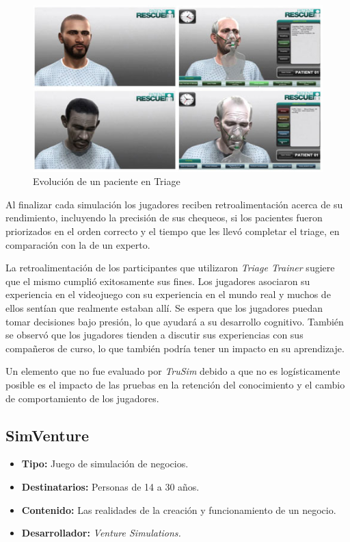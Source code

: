 \begin{figure}[ht!]
\centering
\includegraphics[scale=0.6]{tics/images/patient_side.jpg}
\caption{Evolución de un paciente en Triage}
\label{fig:triage_patient1}
\end{figure}

Al finalizar cada simulación los jugadores reciben retroalimentación acerca de
su rendimiento, incluyendo la precisión de sus chequeos, si los pacientes fueron
priorizados en el orden correcto y el tiempo que les llevó completar el triage,
en comparación con la de un experto.

La retroalimentación de los participantes que utilizaron \emph{Triage Trainer}
sugiere que el mismo cumplió exitosamente sus fines. Los jugadores asociaron su
experiencia en el videojuego con su experiencia en el mundo real y muchos de
ellos sentían que realmente estaban allí. Se espera que los jugadores puedan
tomar decisiones bajo presión, lo que ayudará a su desarrollo cognitivo. También
se observó que los jugadores tienden a discutir sus experiencias con sus
compañeros de curso, lo que también podría tener un impacto en su aprendizaje.

Un elemento que no fue evaluado por \emph{TruSim} debido a que no es
logísticamente posible es el impacto de las pruebas en la retención del
conocimiento y el cambio de comportamiento de los
jugadores\cite{education:games}.


\subsection{SimVenture}

\begin{itemize}
\item \textbf{Tipo:} Juego de simulación de negocios.
\item \textbf{Destinatarios:} Personas de 14 a 30 años.
\item \textbf{Contenido:} Las realidades de la creación y funcionamiento de un
    negocio.
\item \textbf{Desarrollador:} \emph{Venture Simulations.}
\end{itemize}

